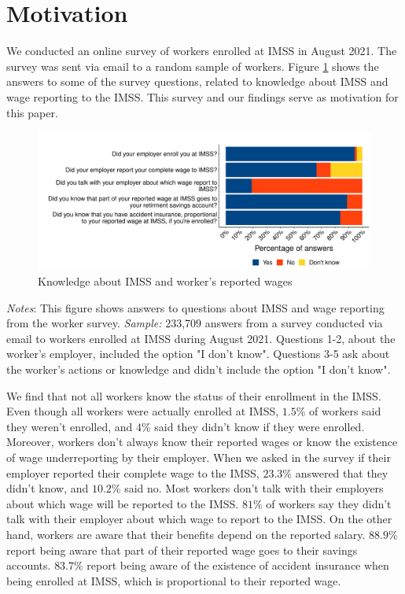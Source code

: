 \documentclass[10pt, oneside]{book}
\begin{document}
\section{Motivation}

We conducted an online survey of workers enrolled at IMSS in August 2021. The survey was sent via email to a random sample of workers. Figure \ref{fig:hist_knowledge_register_survey} shows the answers to some of the survey questions, related to knowledge about IMSS and wage reporting to the IMSS. This survey and our findings serve as motivation for this paper. \\

\begin{figure}[H]
    \centering
    \caption{Knowledge about IMSS and worker's reported wages \label{fig:hist_knowledge_register_survey}}
    \includegraphics[width=\textwidth]{04_Figures/worker_survey/hist_knowledge_register_survey.pdf}
\end{figure}
\scriptsize{\textit{Notes}: This figure shows answers to questions about IMSS and wage reporting from the worker survey. \textit{Sample:} 233,709 answers from a survey conducted via email to workers enrolled at IMSS during August 2021. Questions 1-2, about the worker's employer, included the option "I don't know". Questions 3-5 ask about the worker's actions or knowledge and didn't include the option "I don't know".
} \\

\normalsize

We find that not all workers know the status of their enrollment in the IMSS. Even though all workers were actually enrolled at IMSS, $1.5\%$ of workers said they weren't enrolled, and $4\%$ said they didn't know if they were enrolled. Moreover, workers don't always know their reported wages or know the existence of wage underreporting by their employer. When we asked in the survey if their employer reported their complete wage to the IMSS, $23.3\%$ answered that they didn't know, and $10.2\%$ said no. Most workers don't talk with their employers about which wage will be reported to the IMSS. $81\%$ of workers say they didn't talk with their employer about which wage to report to the IMSS. On the other hand, workers are aware that their benefits depend on the reported salary. $88.9\%$ report being aware that part of their reported wage goes to their savings accounts. $83.7\%$ report being aware of the existence of accident insurance when being enrolled at IMSS, which is proportional to their reported wage. \\
\end{document}
